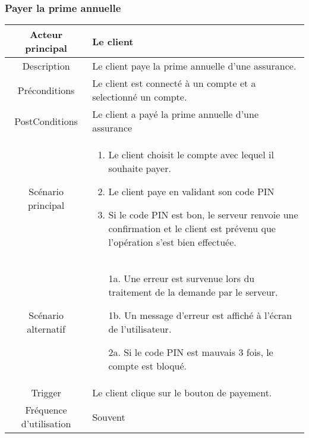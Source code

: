 \documentclass{article}
\begin{document}
\subsubsection{Payer la prime annuelle}
\begin{table}[h]
    \begin{tabular}{|c|p{10cm}|}
       \hline
       Acteur principal&Le client\\
       \hline
       Description&Le client paye la prime annuelle d'une assurance.\\
       \hline
       Préconditions&Le client est connecté à un compte et a selectionné un compte.\\
       \hline
       PostConditions&Le client a payé la prime annuelle d'une assurance\\
       \hline
       Scénario principal& 
             \begin{enumerate}
                \item Le client choisit le compte avec lequel il souhaite payer.
                \item Le client paye en validant son code PIN
                \item Si le code PIN est bon, le serveur renvoie une confirmation et le client est prévenu que l'opération s'est bien effectuée.
             \end{enumerate}     \\
       \hline
       Scénario alternatif&    
       \begin{itemize}
        \item[1a.] Une erreur est survenue lors du traitement de la demande par le serveur.
        \item[1b.] Un message d'erreur est affiché à l'écran de l'utilisateur. 
        \item[2a.] Si le code PIN est mauvais 3 fois, le compte est bloqué.
        \end{itemize}
       \\
       \hline
       Trigger&Le client clique sur le bouton de payement.\\
       \hline
       Fréquence d'utilisation&Souvent\\
       \hline
    \end{tabular}
 \end{table}

\newpage

\end{document}
